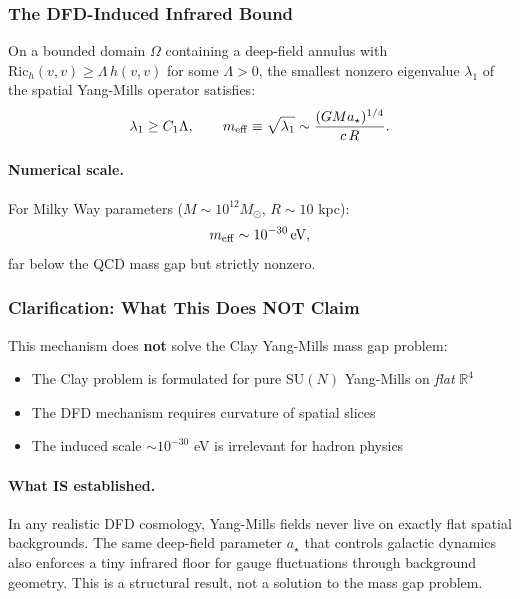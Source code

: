 \subsubsection{The DFD-Induced Infrared Bound}

\begin{proposition}\label{prop:YM-IR}
On a bounded domain $\Omega$ containing a deep-field annulus with 
$\mathrm{Ric}_h(v,v) \geq \Lambda\,h(v,v)$ for some $\Lambda > 0$, the 
smallest nonzero eigenvalue $\lambda_1$ of the spatial Yang-Mills operator satisfies:
\begin{equation}
\lambda_1 \geq C_1 \Lambda, \qquad
m_{\rm eff} \equiv \sqrt{\lambda_1} \sim \frac{(GMa_\star)^{1/4}}{c\,R}.
\end{equation}
\end{proposition}

\paragraph{Numerical scale.}
For Milky Way parameters ($M \sim 10^{12}M_\odot$, $R \sim 10$ kpc):
\begin{equation}
m_{\rm eff} \sim 10^{-30}\,\text{eV},
\end{equation}
far below the QCD mass gap but strictly nonzero.

\subsubsection{Clarification: What This Does NOT Claim}

\begin{tcolorbox}[colback=yellow!5!white, colframe=yellow!60!black, title=Important Clarification]
This mechanism does \textbf{not} solve the Clay Yang-Mills mass gap problem:
\begin{itemize}[nosep]
\item The Clay problem is formulated for pure SU$(N)$ Yang-Mills on \textit{flat} $\mathbb{R}^4$
\item The DFD mechanism requires curvature of spatial slices
\item The induced scale $\sim 10^{-30}$ eV is irrelevant for hadron physics
\end{itemize}
\end{tcolorbox}

\paragraph{What IS established.}
In any realistic DFD cosmology, Yang-Mills fields never live on exactly flat 
spatial backgrounds. The same deep-field parameter $a_\star$ that controls 
galactic dynamics also enforces a tiny infrared floor for gauge fluctuations 
through background geometry. This is a structural result, not a solution to 
the mass gap problem.

